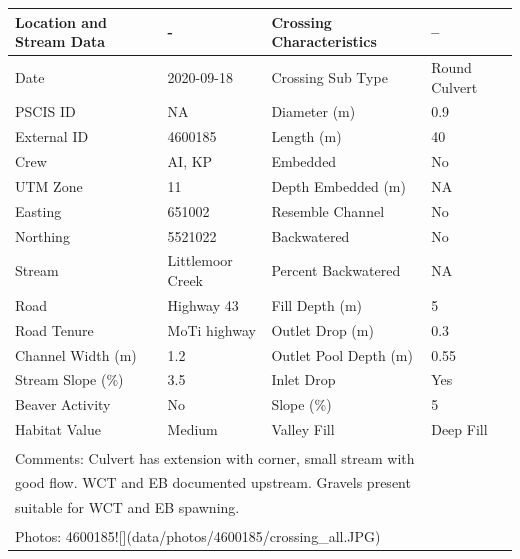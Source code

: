 \documentclass[
]{book}
\begin{document}
\begin{tabular}{l|l|l|l}
\hline
Location and Stream Data & - & Crossing Characteristics & --\\
\hline
Date & 2020-09-18 & Crossing Sub Type & Round Culvert\\
\hline
PSCIS ID & NA & Diameter (m) & 0.9\\
\hline
External ID & 4600185 & Length (m) & 40\\
\hline
Crew & AI, KP & Embedded & No\\
\hline
UTM Zone & 11 & Depth Embedded (m) & NA\\
\hline
Easting & 651002 & Resemble Channel & No\\
\hline
Northing & 5521022 & Backwatered & No\\
\hline
Stream & Littlemoor Creek & Percent Backwatered & NA\\
\hline
Road & Highway 43 & Fill Depth (m) & 5\\
\hline
Road Tenure & MoTi highway & Outlet Drop (m) & 0.3\\
\hline
Channel Width (m) & 1.2 & Outlet Pool Depth (m) & 0.55\\
\hline
Stream Slope (\%) & 3.5 & Inlet Drop & Yes\\
\hline
Beaver Activity & No & Slope (\%) & 5\\
\hline
Habitat Value & Medium & Valley Fill & Deep Fill\\
\hline
\multicolumn{4}{l}{\textsuperscript{} Comments: Culvert has extension with corner, small stream with}\\
\multicolumn{4}{l}{good flow. WCT and EB documented upstream. Gravels present}\\
\multicolumn{4}{l}{suitable for WCT and EB spawning.}\\
\multicolumn{4}{l}{\textsuperscript{} Photos: 4600185![](data/photos/4600185/crossing\_all.JPG)}\\
\end{tabular}
\end{document}
